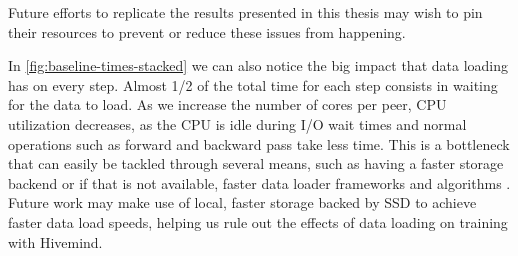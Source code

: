 Future efforts to replicate the results presented in this thesis may wish to pin their resources to prevent or reduce these issues from happening.

In \autoref{fig:baseline-times-stacked} we can also notice the big impact that data loading has on every step.
Almost 1/2 of the total time for each step consists in waiting for the data to load.
As we increase the number of cores per peer, CPU utilization decreases, as the CPU is idle during I/O wait times and normal operations such as forward and backward pass take less time.
This is a bottleneck that can easily be tackled through several means, such as having a faster storage backend or if that is not available, faster data loader frameworks and algorithms \cite{isenko2022bottleneck, leclerc2022ffcv}.
Future work may make use of local, faster storage backed by SSD to achieve faster data load speeds, helping us rule out the effects of data loading on training with Hivemind.

